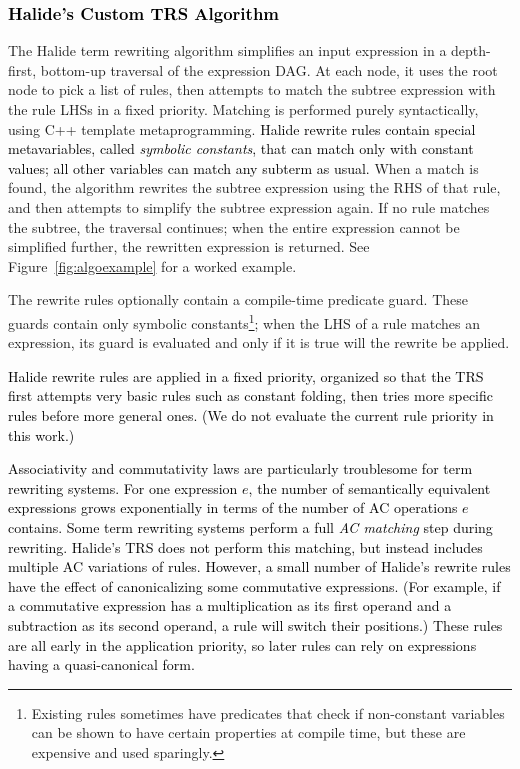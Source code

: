 \documentclass[acmsmall,review]{acmart}\settopmatter{printfolios=true,printccs=false,printacmref=false}
\newcommand{\modified}[1]{\textcolor{black}{{#1}}}
\begin{document}
\subsubsection{\modified{Halide's Custom TRS Algorithm}}
\label{sec:customalgo}
The Halide term rewriting algorithm simplifies an input expression in a
depth-first, bottom-up traversal of the expression DAG. At each node, it 
uses the root node to pick a list of rules, then
attempts to match the subtree expression with the rule LHSs in a fixed priority. Matching
is performed purely syntactically, using C++ template metaprogramming.
 \modified{Halide rewrite rules contain special metavariables,
called \emph{symbolic constants}, that can match only with constant values; all other
variables can match any subterm as usual.}
When a match is found, the algorithm rewrites the
subtree expression using the RHS of that rule, and then attempts to simplify the
subtree expression again. If no rule matches the subtree, the traversal
continues; when the entire expression cannot be simplified further, the
rewritten expression is returned. See Figure~\ref{fig:algoexample} for a worked
example.

The rewrite rules optionally contain a compile-time predicate guard. 
These guards contain only symbolic constants\footnote{Existing 
rules sometimes have predicates that check if
  non-constant variables can be shown to have certain properties at compile
  time, but these are expensive and used sparingly.}; when the LHS of a rule
matches an expression, its guard is evaluated and only if it
is true will the rewrite be applied.

\modified{Halide rewrite rules are applied in a fixed priority, organized so that the TRS 
first attempts very basic rules such as constant folding, then tries more specific 
rules before more general ones. (We do not evaluate the current rule priority in this work.)}

\modified{Associativity and commutativity laws are particularly troublesome for term rewriting systems. 
For one expression $e$, the number of semantically equivalent expressions grows 
exponentially in terms of the number of AC operations $e$ contains. Some term rewriting 
systems perform a full \emph{AC matching} step during rewriting. Halide's TRS does not
perform this matching, but instead
includes multiple AC variations of rules.
However, a small number of Halide's rewrite rules have the effect of canonicalizing some commutative
expressions. (For example, if a commutative expression has a multiplication as its 
first operand and a subtraction as its second operand, a rule will switch their positions.)
These rules are all early in the application priority, so later rules can rely on
expressions having a quasi-canonical form.}
\end{document}
